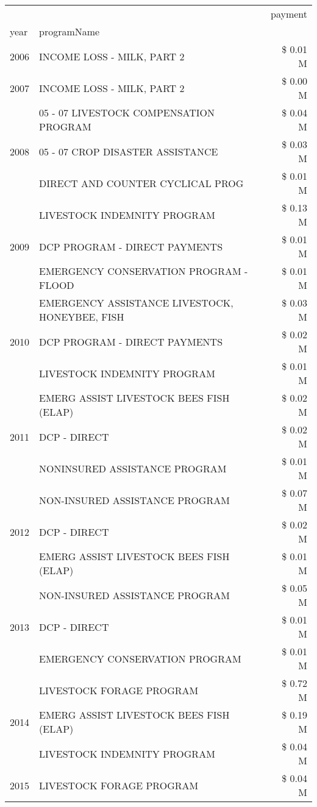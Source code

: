 \begin{tabular}{llr}
\toprule
 &  & payment \\
year & programName &  \\
\midrule
2006 & INCOME LOSS - MILK, PART 2 & \$ 0.01 M \\
\cline{1-3}
2007 & INCOME LOSS - MILK, PART 2 & \$ 0.00 M \\
\cline{1-3}
\multirow[t]{3}{*}{2008} & 05 - 07 LIVESTOCK COMPENSATION PROGRAM & \$ 0.04 M \\
 & 05 - 07 CROP DISASTER ASSISTANCE & \$ 0.03 M \\
 & DIRECT AND COUNTER CYCLICAL PROG & \$ 0.01 M \\
\cline{1-3}
\multirow[t]{3}{*}{2009} & LIVESTOCK INDEMNITY PROGRAM & \$ 0.13 M \\
 & DCP PROGRAM - DIRECT PAYMENTS & \$ 0.01 M \\
 & EMERGENCY CONSERVATION PROGRAM - FLOOD & \$ 0.01 M \\
\cline{1-3}
\multirow[t]{3}{*}{2010} & EMERGENCY ASSISTANCE LIVESTOCK, HONEYBEE, FISH & \$ 0.03 M \\
 & DCP PROGRAM - DIRECT PAYMENTS & \$ 0.02 M \\
 & LIVESTOCK INDEMNITY PROGRAM & \$ 0.01 M \\
\cline{1-3}
\multirow[t]{3}{*}{2011} & EMERG ASSIST LIVESTOCK BEES FISH (ELAP) & \$ 0.02 M \\
 & DCP - DIRECT & \$ 0.02 M \\
 & NONINSURED ASSISTANCE PROGRAM & \$ 0.01 M \\
\cline{1-3}
\multirow[t]{3}{*}{2012} & NON-INSURED ASSISTANCE PROGRAM & \$ 0.07 M \\
 & DCP - DIRECT & \$ 0.02 M \\
 & EMERG ASSIST LIVESTOCK BEES FISH (ELAP) & \$ 0.01 M \\
\cline{1-3}
\multirow[t]{3}{*}{2013} & NON-INSURED ASSISTANCE PROGRAM & \$ 0.05 M \\
 & DCP - DIRECT & \$ 0.01 M \\
 & EMERGENCY CONSERVATION PROGRAM & \$ 0.01 M \\
\cline{1-3}
\multirow[t]{3}{*}{2014} & LIVESTOCK FORAGE PROGRAM & \$ 0.72 M \\
 & EMERG ASSIST LIVESTOCK BEES FISH (ELAP) & \$ 0.19 M \\
 & LIVESTOCK INDEMNITY PROGRAM & \$ 0.04 M \\
\cline{1-3}
\multirow[t]{3}{*}{2015} & LIVESTOCK FORAGE PROGRAM & \$ 0.04 M \\

\end{tabular}

